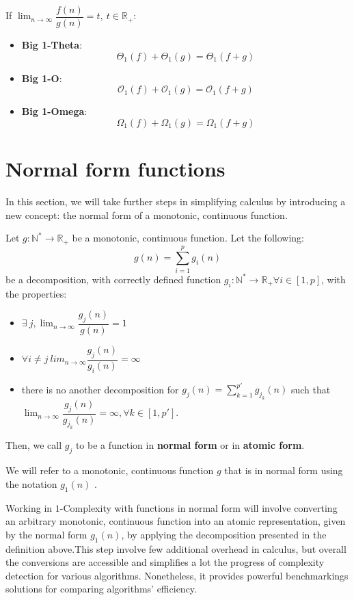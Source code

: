 \begin{lemma}
If $\lim_{n\to\infty} \dfrac{f(n)}{g(n)} = t, \ t \in \mathbb{R}_{+}$:
\begin{itemize}
  \item \textbf{Big 1-Theta}: 
  \[  \Theta_{1}(f) + \Theta_{1}(g) = \Theta_{1}(f + g)\]
  \item \textbf{Big 1-O}: 
  \[  \mathcal{O}_{1}(f) + \mathcal{O}_{1}(g) = \mathcal{O}_{1}(f + g)\]
  \item \textbf{Big 1-Omega}: 
  \[  \Omega_{1}(f) + \Omega_{1}(g) = \Omega_{1}(f + g)\]
\end{itemize}
\end{lemma}

\section{Normal form functions}
In this section, we will take further steps in simplifying calculus by introducing a new concept: the normal form of a monotonic, continuous function.
\begin{definition}
Let $g:\mathbb{N}^{*}\longrightarrow\mathbb{R}_{+} $ be a monotonic, continuous function. Let the following:
\[ g(n) = \sum_{i=1}^{p} g_{i}(n)\]
be a decomposition, with correctly defined function $g_{i}:\mathbb{N}^{*}\longrightarrow\mathbb{R}_{+} \forall i \in [1, p]$, with the properties:
\begin{itemize}

\item $ \exists \ j, \lim_{n\to\infty} \dfrac{g_{j}(n)}{g(n)} = 1$
\item $\forall i \neq j \  lim_{n\to\infty} \dfrac{g_{j}(n)}{g_{i}(n)} = \infty$ 
\item there is no another decomposition for $g_{j}(n) = \sum_{k=1}^{p'} g_{j_{k}}(n)$ such that $\lim_{n\to\infty} \dfrac{g_{j}(n)}{g_{j_{k}}(n)} = \infty, \forall k \in [1, p']$.
 \end{itemize}
 Then, we call $g_{j}$ to be a function in \textbf{normal form} or in \textbf{atomic form}.
\end{definition}

\begin{remark}
We will refer to a monotonic, continuous function $g$ that is in normal form using the notation $g_{1}(n)$ .
\end{remark}


\begin{remark}
Working in $1$-Complexity with functions in normal form will involve converting an arbitrary monotonic, continuous function into an atomic representation, given by the normal form $g_{1}(n)$, by applying the decomposition presented in the definition above.This step involve few additional overhead in calculus, but overall the conversions are accessible and simplifies a lot the progress of complexity detection for various algorithms. Nonetheless, it provides powerful benchmarkings solutions for comparing algorithms' efficiency. 
\end{remark}

